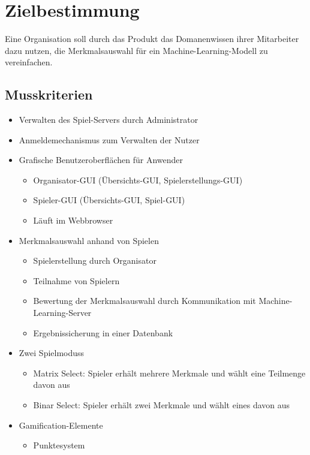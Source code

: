 \documentclass[a4paper]{scrreprt}
\begin{document}
    \chapter{Zielbestimmung}
    Eine Organisation soll durch das \Gls{Produkt} das \Gls{Domanenwissen} ihrer Mitarbeiter dazu nutzen, die Merkmalsauswahl für ein Machine-Learning-Modell zu vereinfachen.



    \section{Musskriterien}
    \begin{itemize} %
        \item Verwalten des \Gls{Spiel-Server}s durch \Gls{Administrator}
    	\item Anmeldemechanismus zum Verwalten der Nutzer
	\item Grafische Benutzeroberflächen für Anwender 
        \begin{itemize}
            \item Organisator-GUI (Übersichts-GUI, Spielerstellungs-GUI) 
            \item Spieler-GUI (Übersichts-GUI, Spiel-GUI) 
            \item Läuft im Webbrowser 
        \end{itemize}
        \item Merkmalsauswahl anhand von Spielen  %
        \begin{itemize}
            \item Spielerstellung durch \Gls{Organisator}
            \item Teilnahme von \Gls{Spieler}n %
            \item Bewertung der Merkmalsauswahl durch Kommunikation mit Machine-Learning-Server 
            \item Ergebnissicherung in einer Datenbank 
        \end{itemize}
        \item Zwei \Glspl{Spielmodus}
        \begin{itemize}
            \item \Gls{Matrix Select}: \Gls{Spieler} erhält mehrere Merkmale und wählt eine Teilmenge davon aus %
            \item \Gls{Binar Select}: \Gls{Spieler} erhält zwei Merkmale und wählt eines davon aus
        \end{itemize}
        \item Gamification-Elemente
        \begin{itemize}
                  \item Punktesystem 
        \end{itemize}
    \end{itemize}
    \newpage %
\end{document}

